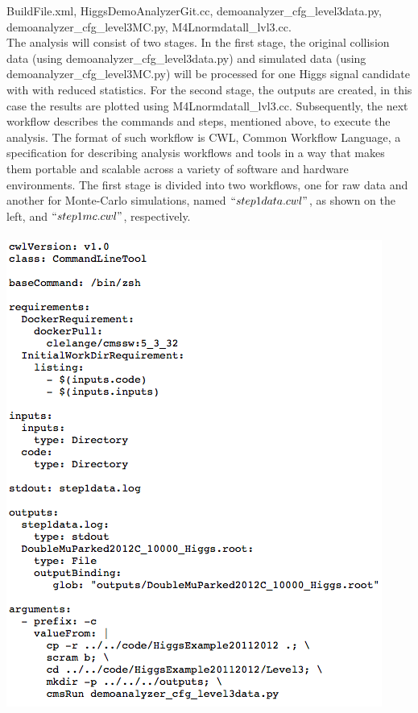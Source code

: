 \documentclass[letter]{article}
\newcommand\tab[1][1cm]{\hspace*{#1}}
\begin{document}
BuildFile.xml, HiggsDemoAnalyzerGit.cc, demoanalyzer\_cfg\_level3data.py, demoanalyzer\_cfg\_level3MC.py, M4Lnormdatall\_lvl3.cc.\vspace{5pt}
\\ \tab The analysis will consist of two stages. In the first stage, the original collision data (using demoanalyzer\_cfg\_level3data.py) and simulated data (using demoanalyzer\_cfg\_level3MC.py) will be processed for one Higgs signal candidate with with reduced statistics\cite{github}. For the second stage, the outputs are created, in this case the results are plotted using M4Lnormdatall\_lvl3.cc.
Subsequently, the next workflow describes the commands and steps, mentioned above, to execute the analysis. The format of such workflow is CWL\cite{cwl}, Common Workflow Language, a specification for describing analysis workflows and tools in a way that makes them portable and scalable across a variety of software and hardware environments. The first stage is divided into two workflows, one for raw data and another for Monte-Carlo simulations, named $``step1data.cwl"$, as shown on the left, and $``step1mc.cwl"$, respectively.\\ \\
\hspace{-20pt}
\includegraphics[scale=0.45]{step1data} 
\end{document}
